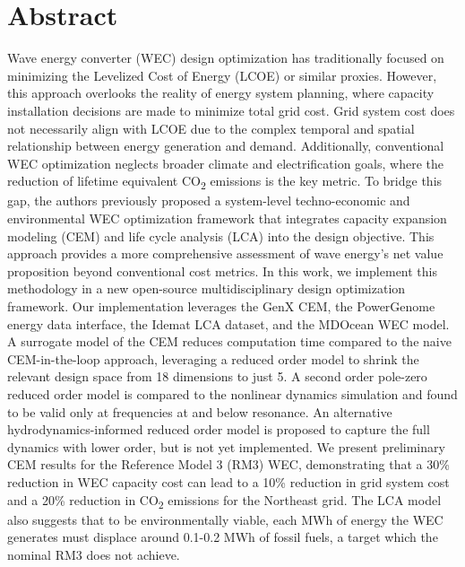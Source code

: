 \documentclass[10pt,twoside]{article}
\begin{document}
\section*{Abstract}
Wave energy converter (WEC) design optimization has traditionally focused on minimizing the Levelized Cost of Energy (LCOE) or similar proxies.
However, this approach overlooks the reality of energy system planning, where capacity installation decisions are made to minimize total grid cost.
Grid system cost does not necessarily align with LCOE due to the complex temporal and spatial relationship between energy generation and demand.
Additionally, conventional WEC optimization neglects broader climate and electrification goals, where the reduction of lifetime equivalent CO\textsubscript{2} emissions is the key metric.
To bridge this gap, the authors previously proposed a system-level techno-economic and environmental WEC optimization framework that integrates capacity expansion modeling (CEM) and life cycle analysis (LCA) into the design objective.
This approach provides a more comprehensive assessment of wave energy's net value proposition beyond conventional cost metrics.
In this work, we implement this methodology in a new open-source multidisciplinary design optimization framework.
Our implementation leverages the GenX CEM, the PowerGenome energy data interface, the Idemat LCA dataset, and the MDOcean WEC model.
A surrogate model of the CEM reduces computation time compared to the naive CEM-in-the-loop approach, leveraging a reduced order model to shrink the relevant design space from 18 dimensions to just 5.
A second order pole-zero reduced order model is compared to the nonlinear dynamics simulation and found to be valid only at frequencies at and below resonance.
An alternative hydrodynamics-informed reduced order model is proposed to capture the full dynamics with lower order, but is not yet implemented.
We present preliminary CEM results for the Reference Model 3 (RM3) WEC, demonstrating that a 30\% reduction in WEC capacity cost can lead to a 10\% reduction in grid system cost and a 20\% reduction in CO\textsubscript{2} emissions for the Northeast grid.
The LCA model also suggests that to be environmentally viable, each MWh of energy the WEC generates must displace around 0.1-0.2 MWh of fossil fuels, a target which the nominal RM3 does not achieve.%
\end{document}

